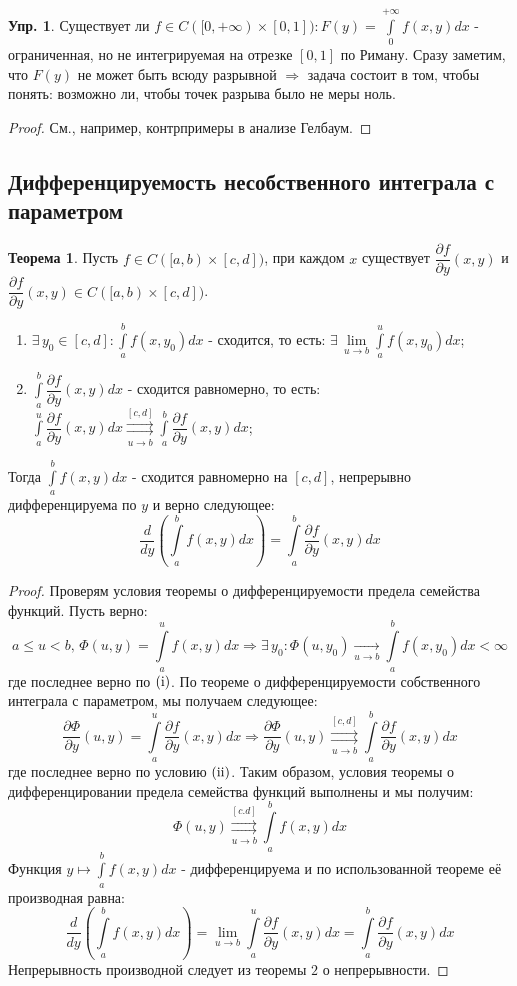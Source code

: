 \documentclass[12pt]{article}
\newcommand{\RN}[1]{%
	\textup{\uppercase\expandafter{\romannumeral#1}}%
}
\theoremstyle{definition}
\newtheorem{exrc}{Упр.}
\newtheorem{theorem}{Теорема}
\newcommand{\ddint}[2]{\displaystyle\int\limits_{#1}^{#2}}
\newcommand{\uconvm}[2]{\overset{#1}{\underset{#2}{\rightrightarrows}}}
\begin{document}
\begin{exrc}
	Существует ли $f \in C([0,+\infty) \times [0,1]) \colon F(y) = \ddint{0}{+\infty}f(x,y)dx$ - ограниченная, но не интегрируемая на отрезке $[0,1]$ по Риману. Сразу заметим, что $F(y)$ не может быть всюду разрывной $\Rightarrow$ задача состоит в том, чтобы понять: возможно ли, чтобы точек разрыва было не меры ноль.
\end{exrc}
\begin{proof}
	См., например, контрпримеры в анализе Гелбаум.
\end{proof}

\subsection*{Дифференцируемость несобственного интеграла с параметром}
\begin{theorem}
	Пусть $f \in C([a,b)\times[c,d])$, при каждом $x$ существует $\dfrac{\partial f}{\partial y}(x,y)$ и $\dfrac{\partial f}{\partial y}(x,y) \in C([a,b)\times[c,d])$.
	\begin{enumerate}[label=(\Roman*)]
		\item $\exists \, y_0 \in [c,d] \colon \ddint{a}{b}f(x,y_0)dx$ - сходится, то есть: $\exists \, \lim\limits_{u \to b}\ddint{a}{u}f(x,y_0)dx$;
		\item $\ddint{a}{b}\dfrac{\partial f}{\partial y}(x,y)dx$ - сходится равномерно, то есть: $\ddint{a}{u}\dfrac{\partial f}{\partial y}(x,y)dx \uconvm{[c,d]}{u \to b}\ddint{a}{b}\dfrac{\partial f}{\partial y}(x,y)dx$;
	\end{enumerate}	
	Тогда $\ddint{a}{b}f(x,y)dx$ - сходится равномерно на $[c,d]$, непрерывно дифференцируема по $y$ и верно следующее:
	$$
		\dfrac{d}{dy}\left(\ddint{a}{b}f(x,y)dx\right) = \ddint{a}{b}\dfrac{\partial f}{\partial y}(x,y)dx
	$$
\end{theorem}
\begin{proof}
	Проверям условия теоремы о дифференцируемости предела семейства функций. Пусть верно:
	$$
		a \leq u <b, \, \Phi(u,y) = \ddint{a}{u}f(x,y)dx \Rightarrow \exists \, y_0 \colon \Phi(u,y_0) \xrightarrow[u \to b]{}\ddint{a}{b}f(x,y_0)dx < \infty
	$$
	где последнее верно по $(\RN{1})$. По теореме о дифференцируемости собственного интеграла с параметром, мы получаем следующее:
	$$
		\dfrac{\partial \Phi}{\partial y}(u,y) = \ddint{a}{u}\dfrac{\partial f}{\partial y}(x,y)dx \Rightarrow \dfrac{\partial \Phi}{\partial y}(u,y) \uconvm{[c,d]}{u \to b} \ddint{a}{b}\dfrac{\partial f}{\partial y}(x,y)dx
	$$
	где последнее верно по условию $(\RN{2})$. Таким образом, условия теоремы о дифференцировании предела семейства функций выполнены и мы получим: 
	$$
		\Phi(u,y)\uconvm{[c.d]}{u \to b}\ddint{a}{b}f(x,y)dx
	$$ 
	Функция $y \mapsto \ddint{a}{b}f(x,y)dx$ - дифференцируема и по использованной теореме её производная равна: 
	$$
				\dfrac{d}{dy}\left(\ddint{a}{b}f(x,y)dx\right) = \lim\limits_{u \to b}\ddint{a}{u}\dfrac{\partial f}{\partial y}(x,y)dx = \ddint{a}{b}\dfrac{\partial f}{\partial y}(x,y)dx
	$$
	Непрерывность производной следует из теоремы $2$ о непрерывности.
\end{proof}
\end{document}

